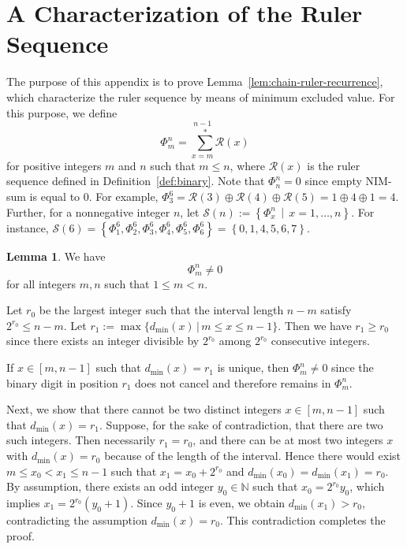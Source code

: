 \documentclass[a4paper,11pt]{amsart}
\theoremstyle{definition}
\newtheorem{lem}{Lemma}[section]
\newenvironment{demo}[1]{%
  \trivlist
  \item[\hskip\labelsep
        {\bf #1.}]
}{%
\hfill\qedsymbol
  \endtrivlist
}
\newcommand{\nimsum}{{\sum}^{*}}
\numberwithin{equation}{section}
\def\Non{\mathbb{N}}
\def\fnh#1{\mathscr{R}\left({#1}\right)}
\def\fnH#1#2{\Phi_{#1}^{#2}}
\def\fnS#1{\mathscr{S}\left({#1}\right)}
\def\placemin#1{d_{\min}\left({#1}\right)}
\begin{document}
\section{A Characterization of the Ruler Sequence}\label{sc:RC}
%
The purpose of this appendix is to prove Lemma~\ref{lem:chain-ruler-recurrence},
which characterize the ruler sequence by means of minimum excluded value.
%
%
For this purpose, we define 
\begin{equation}
\fnH{m}{n}=\overset{n-1}{\underset{x=m}{\,\,\,\nimsum}}\fnh{x}
\end{equation}
for positive integers $m$ and $n$ such that $m\leq n$,
where $\fnh{x}$ is the ruler sequence defined in Definition~\ref{def:binary}.
Note that $\fnH{n}{n}=0$ since empty NIM-sum is equal to $0$.
For example, $\fnH{3}{6}=\fnh{3}\oplus\fnh{4}\oplus\fnh{5}=1\oplus4\oplus1=4$.
Further, for a nonnegative integer $n$,
let $\fnS{n}:=\left\{\fnH{x}{n} \,\middle|\, x=1,\dots,n\right\}$.
For instance,
$\fnS{6}=\left\{ \fnH{1}{6},\fnH{2}{6},\fnH{3}{6},\fnH{4}{6},\fnH{5}{6},\fnH{6}{6} \right\}
=\left\{ 0,1,4,5,6,7\right\}$.
%
\begin{lem}\label{lem:nim-nonzero}
We have
\[
\fnH{m}{n}\neq0
\]
for all integers $m,n$ such that $1\leq m<n$.
%
\end{lem}
%
\begin{demo}{Proof}
%
Let $r_{0}$ be the largest integer such that the interval length $n-m$ satisfy $2^{r_{0}}\leq n-m$.
Let $r_{1}:=\max\{\placemin{x} \,|\, m\leq x\leq n-1\}$.
Then we have $r_{1}\geq r_{0}$ since there exists an integer divisible by $2^{r_{0}}$ 
among $2^{r_{0}}$ consecutive integers.
%
\par
%
If $x\in[m, n-1]$ such that $\placemin{x}=r_{1}$ is unique,
then $\fnH{m}{n}\neq0$ 
since the binary digit in position $r_{1}$ does not cancel and therefore remains in $\fnH{m}{n}$.
\par\smallskip
Next, we show that there cannot be two distinct integers $x\in[m, n-1]$ such that $\placemin{x}=r_{1}$.
Suppose, for the sake of contradiction, that there are two such integers.
Then necessarily $r_{1}=r_{0}$,
and there can be at most two integers $x$ with $\placemin{x}=r_{0}$ because of the length of the interval.
Hence there would exist $m\leq x_{0}<x_{1}\leq n-1$ such that $x_{1}=x_{0}+2^{r_{0}}$ and $\placemin{x_{0}}=\placemin{x_{1}}=r_{0}$.
By assumption, there exists an odd integer $y_{0}\in\Non$ such that $x_{0}=2^{r_{0}}y_{0}$,
which implies $x_{1}=2^{r_{0}}(y_{0}+1)$.
Since $y_{0}+1$ is even, we obtain $\placemin{x_{1}}>r_{0}$,
contradicting the assumption $\placemin{x}=r_{0}$.
This contradiction completes the proof.
%
%
\end{demo}
\end{document}
